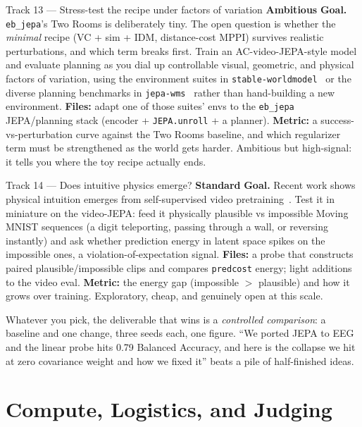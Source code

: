 \documentclass{article}
\newcommand{\code}[1]{\texttt{\small #1}}
\newcommand{\diffmed}{\colorbox{ebamber!18}{\textcolor{ebamber}{\small\bfseries Standard}}}
\newcommand{\diffhard}{\colorbox{ebred!15}{\textcolor{ebred}{\small\bfseries Ambitious}}}
\begin{document}
\begin{trackbox}{Track 13 --- Stress-test the recipe under factors of variation \hfill \diffhard{}}
\textbf{Goal.} \texttt{eb\_jepa}'s Two Rooms is deliberately tiny. The open question
is whether the \emph{minimal} recipe (VC + sim + IDM, distance-cost MPPI) survives
realistic perturbations, and which term breaks first. Train an AC-video-JEPA-style
model and evaluate planning as you dial up controllable visual, geometric, and
physical factors of variation, using the environment suites in
\texttt{stable-worldmodel}~\citep{stableworldmodel} or the diverse planning
benchmarks in \texttt{jepa-wms}~\citep{terver2026JEPAWMs} rather than hand-building a
new environment. \textbf{Files:} adapt one of those suites' envs to the
\code{eb\_jepa} JEPA/planning stack (encoder + \code{JEPA.unroll} + a planner).
\textbf{Metric:} a success-vs-perturbation curve against the Two Rooms baseline, and
which regularizer term must be strengthened as the world gets harder. Ambitious but
high-signal: it tells you where the toy recipe actually ends.
\end{trackbox}

\begin{trackbox}{Track 14 --- Does intuitive physics emerge? \hfill \diffmed{}}
\textbf{Goal.} Recent work shows physical intuition emerges from self-supervised
video pretraining~\citep{garrido2025intuitivephysicsunderstandingemerges}. Test it
in miniature on the video-JEPA: feed it physically plausible vs impossible Moving
MNIST sequences (a digit teleporting, passing through a wall, or reversing
instantly) and ask whether prediction energy in latent space spikes on the
impossible ones, a violation-of-expectation signal. \textbf{Files:} a probe that
constructs paired plausible/impossible clips and compares \code{predcost} energy;
light additions to the video eval. \textbf{Metric:} the energy gap (impossible $>$
plausible) and how it grows over training. Exploratory, cheap, and genuinely
open at this scale.
\end{trackbox}

\begin{tipbox}
Whatever you pick, the deliverable that wins is a \emph{controlled comparison}: a
baseline and one change, three seeds each, one figure. ``We ported JEPA to EEG and
the linear probe hits 0.79 Balanced Accuracy, and here is the collapse we hit at
zero covariance weight and how we fixed it'' beats a pile of half-finished ideas.
\end{tipbox}
\section{Compute, Logistics, and Judging}
\label{sec:logistics}
\end{document}
